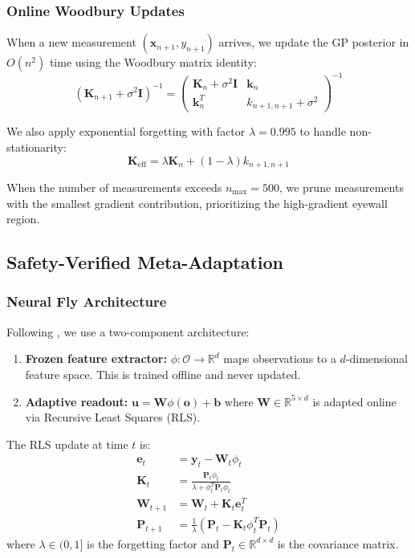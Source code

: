 \documentclass[12pt,a4paper,twocolumn]{article}
\newcommand{\cO}{\mathcal{O}}
\newcommand{\R}{\mathbb{R}}
\newcommand{\vect}[1]{\mathbf{#1}}
\newcommand{\mat}[1]{\mathbf{#1}}
\begin{document}
\subsubsection{Online Woodbury Updates}
When a new measurement $(\vect{x}_{n+1}, y_{n+1})$ arrives, we update the GP posterior in $O(n^2)$ time using the Woodbury matrix identity:
\begin{equation}
    (\mat{K}_{n+1} + \sigma^2\mat{I})^{-1} = \begin{pmatrix} \mat{K}_n + \sigma^2\mat{I} & \vect{k}_n \\ \vect{k}_n^T & k_{n+1,n+1} + \sigma^2 \end{pmatrix}^{-1}
\end{equation}

We also apply exponential forgetting with factor $\lambda = 0.995$ to handle non-stationarity:
\begin{equation}
    \mat{K}_{\text{eff}} = \lambda \mat{K}_n + (1 - \lambda) k_{n+1,n+1}
\end{equation}

When the number of measurements exceeds $n_{\max} = 500$, we prune measurements with the smallest gradient contribution, prioritizing the high-gradient eyewall region.

\subsection{Safety-Verified Meta-Adaptation}
\label{sec:meta_adaptation}

\subsubsection{Neural Fly Architecture}
Following \citet{NeuralFly2022}, we use a two-component architecture:
\begin{enumerate}[leftmargin=*]
    \item \textbf{Frozen feature extractor:} $\phi : \cO \to \R^d$ maps observations to a $d$-dimensional feature space. This is trained offline and never updated.
    \item \textbf{Adaptive readout:} $\vect{u} = \mat{W}\phi(\vect{o}) + \vect{b}$ where $\mat{W} \in \R^{5 \times d}$ is adapted online via Recursive Least Squares (RLS).
\end{enumerate}

The RLS update at time $t$ is:
\begin{align}
    \vect{e}_t &= \vect{y}_t - \mat{W}_t \phi_t \label{eq:rls_error} \\
    \mat{K}_t &= \frac{\mat{P}_t \phi_t}{\lambda + \phi_t^T \mat{P}_t \phi_t} \label{eq:rls_gain} \\
    \mat{W}_{t+1} &= \mat{W}_t + \mat{K}_t \vect{e}_t^T \label{eq:rls_update} \\
    \mat{P}_{t+1} &= \frac{1}{\lambda}\left(\mat{P}_t - \mat{K}_t \phi_t^T \mat{P}_t\right) \label{eq:rls_cov}
\end{align}
where $\lambda \in (0, 1]$ is the forgetting factor and $\mat{P}_t \in \R^{d \times d}$ is the covariance matrix.
\end{document}
